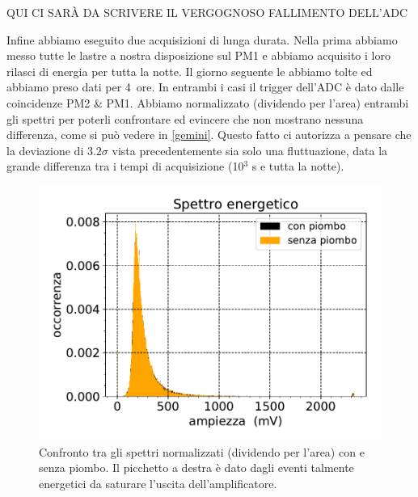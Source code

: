 \begin{huge}
QUI CI SAR\`A DA SCRIVERE IL VERGOGNOSO FALLIMENTO DELL'ADC
\end{huge}
\label{sez}
Infine abbiamo eseguito due acquisizioni di lunga durata. Nella prima abbiamo messo tutte le lastre a nostra disposizione sul PM1 e abbiamo acquisito i loro rilasci di energia per tutta la notte. Il giorno seguente le abbiamo tolte ed abbiamo preso dati per \SI{4}{ore}. In entrambi i casi il trigger dell'ADC è dato dalle coincidenze PM2 \& PM1.  Abbiamo normalizzato (dividendo per l'area)
entrambi gli spettri per poterli confrontare ed evincere che non mostrano nessuna differenza, come si può vedere in \autoref{gemini}. Questo fatto ci autorizza a pensare che la deviazione di $3.2\sigma$ vista precedentemente sia solo una fluttuazione, data la grande differenza tra i tempi di acquisizione (10$^3$\! s e tutta la notte). 

\begin{figure}[h]
\centering
\includegraphics[width=8 cm]{gemelli}
\caption{Confronto tra gli spettri normalizzati (dividendo per l'area) con e senza piombo. Il picchetto a destra è dato dagli eventi talmente energetici da saturare l'uscita dell'amplificatore.}
\label{gemini}    
\end{figure}

